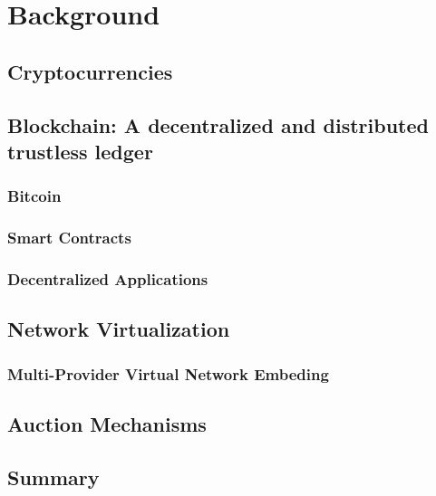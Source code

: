 \chapter{Background}
\label{ch:background}

\section{Cryptocurrencies}

\section{Blockchain: A decentralized and distributed trustless ledger}

\subsection{Bitcoin}

\subsection{Smart Contracts}

\subsection{Decentralized Applications}

\section{Network Virtualization}

\subsection{Multi-Provider Virtual Network Embeding}

\section{Auction Mechanisms}

\section{Summary}


